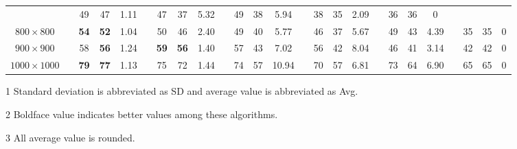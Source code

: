 \documentclass[preprint,5pt]{elsarticle}
\begin{document}
\begin{table}[htbp]
\begin{threeparttable}
\begin{center}
\begin{tabular}{ccccccccccccccccccccccccc}
                   &&{\cellcolor[rgb]{0.729,0.729,0.729}}49 &{\cellcolor[rgb]{0.729,0.729,0.729}}47  &{\cellcolor[rgb]{0.729,0.729,0.729}}1.11
                   &&47 &37  &5.32
                   &&49 &38  &5.94
                   &&38 &35  &2.09
                   &&36 &36  &0      \\
  $800\times 800$  &&{\cellcolor[rgb]{0.729,0.729,0.729}}\textbf{54} &{\cellcolor[rgb]{0.729,0.729,0.729}}\textbf{52}   &{\cellcolor[rgb]{0.729,0.729,0.729}}1.04
                   &&{\cellcolor[rgb]{0.729,0.729,0.729}}50 &{\cellcolor[rgb]{0.729,0.729,0.729}}46  &{\cellcolor[rgb]{0.729,0.729,0.729}}2.40
                   &&49 &40 &5.77
                   &&46 &37 &5.67
                   &&49 &43 &4.39
                   &&35 &35 &0      \\
  $900\times 900$  &&{\cellcolor[rgb]{0.729,0.729,0.729}}58 &{\cellcolor[rgb]{0.729,0.729,0.729}}\textbf{56}   &{\cellcolor[rgb]{0.729,0.729,0.729}}1.24
                   &&{\cellcolor[rgb]{0.729,0.729,0.729}}\textbf{59} &{\cellcolor[rgb]{0.729,0.729,0.729}}\textbf{56}  &{\cellcolor[rgb]{0.729,0.729,0.729}}1.40
                   &&57 &43 &7.02
                   &&56 &42 &8.04
                   &&46 &41 &3.14
                   &&42 &42 &0      \\
  $1000\times 1000$  &&{\cellcolor[rgb]{0.729,0.729,0.729}}\textbf{79} &{\cellcolor[rgb]{0.729,0.729,0.729}}\textbf{77}   &{\cellcolor[rgb]{0.729,0.729,0.729}}1.13
                     &&{\cellcolor[rgb]{0.729,0.729,0.729}}75 &{\cellcolor[rgb]{0.729,0.729,0.729}}72  &{\cellcolor[rgb]{0.729,0.729,0.729}}1.44
                     &&74 &57 &10.94
                     &&70 &57 &6.81
                     &&73 &64 &6.90
                     &&65 &65  &0      \\
\hline\hline
\end{tabular}
\begin{tablenotes}
\item[1] Standard deviation is abbreviated as SD and average value is abbreviated as Avg.
\item[2] Boldface value indicates better values among these algorithms.
\item[3] All average value is rounded.
\end{tablenotes}
\vspace{5pt}
\end{center}
\end{threeparttable}
\end{table}
\end{document}
